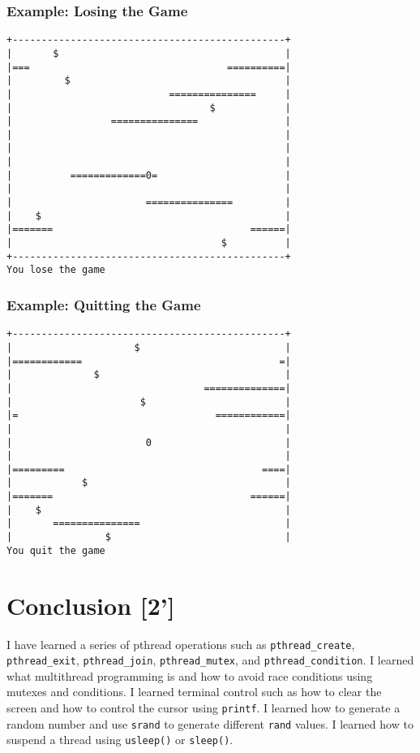 \documentclass{article}
\begin{document}
\subsubsection{Example: Losing the Game}
\begin{verbatim}
+-----------------------------------------------+
|       $                                       |
|===                                  ==========|
|         $                                     |
|                           ===============     |
|                                  $            |
|                 ===============               |
|                                               |
|                                               |
|                                               |
|          =============0=                      |
|                                               |
|                       ===============         |
|    $                                          |
|=======                                  ======|
|                                    $          |
+-----------------------------------------------+
You lose the game
\end{verbatim}

\subsubsection{Example: Quitting the Game}
\begin{verbatim}
+-----------------------------------------------+
|                     $                         |
|============                                  =|
|              $                                |
|                                 ==============|
|                      $                        |
|=                                  ============|
|                                               |
|                       0                       |
|                                               |
|=========                                  ====|
|            $                                  |
|=======                                  ======|
|    $                                          |
|       ===============                         |
|                $                              |
You quit the game
\end{verbatim}


\section{Conclusion [2']}
I have learned a series of pthread operations such as \texttt{pthread\_create}, \texttt{pthread\_exit}, \texttt{pthread\_join}, \texttt{pthread\_mutex}, and \texttt{pthread\_condition}.
I learned what multithread programming is and how to avoid race conditions using mutexes and conditions.
I learned terminal control such as how to clear the screen and how to control the cursor using \texttt{printf}.
I learned how to generate a random number and use \texttt{srand} to generate different \texttt{rand} values.
I learned how to suspend a thread using \texttt{usleep()} or \texttt{sleep()}.
\end{document}
